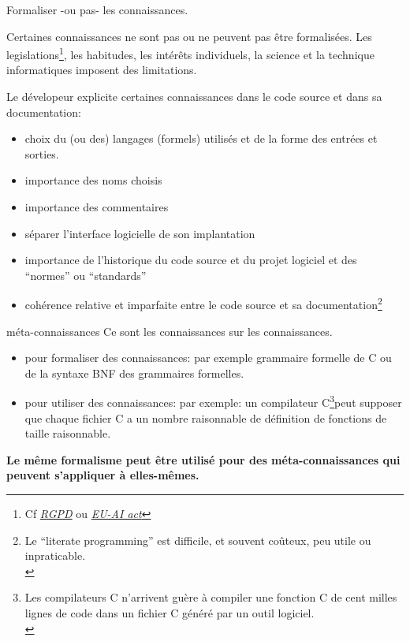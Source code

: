 \documentclass[final,a4,xcolor={svgnames,dvipsnames}]{beamer}
\begin{document}
 \begin{frame}{Formaliser -ou pas- les connaissances.}

   Certaines connaissances ne sont pas ou ne peuvent pas être
   formalisées. Les legislations\footnote{Cf
   \href{https://www.cnil.fr/fr/reglement-europeen-protection-donnees}{\it RGPD}
   ou
   \href{https://artificialintelligenceact.eu/high-level-summary/}{\it EU-AI
     act}}, les habitudes, les intérêts individuels, la science et la
   technique informatiques imposent des limitations.

   \bigskip
   
   Le dévelopeur explicite certaines connaissances dans le code source et
   dans sa documentation:
   \begin{relsize}{-0.5}
   \begin{itemize}
   \item choix du (ou des) langages (formels) utilisés et de la forme des entrées et sorties.
   \item importance des noms choisis
   \item importance des commentaires
   \item séparer l'interface logicielle de son implantation
   \item importance de l'historique du code source et du projet
     logiciel et des ``normes'' ou ``standards''
   \item cohérence relative et imparfaite entre le code source et sa
     documentation\footnote{Le ``literate programming'' est difficile,
     et souvent coûteux, peu utile ou inpraticable.\medskip\\}
   \end{itemize}
   \end{relsize}
 \end{frame}

 \begin{frame}{méta-connaissances}
   Ce sont les connaissances sur les connaissances.


   \begin{itemize}
   \item pour formaliser des connaissances: par exemple grammaire
     formelle de C ou de la syntaxe BNF des grammaires formelles.
   \item pour utiliser des connaissances: par exemple: un compilateur
     C\footnote{Les compilateurs C n'arrivent guère à compiler une fonction C de cent milles lignes de code dans un fichier C généré par un outil logiciel.\\}peut supposer que chaque fichier C a un nombre raisonnable de
     définition de fonctions de taille raisonnable.
   \end{itemize}

   \bigskip
   
   \textbf{Le même formalisme peut être utilisé pour des
     méta-connaissances qui peuvent s'appliquer à elles-mêmes.}
     
 \end{frame}
\end{document}

